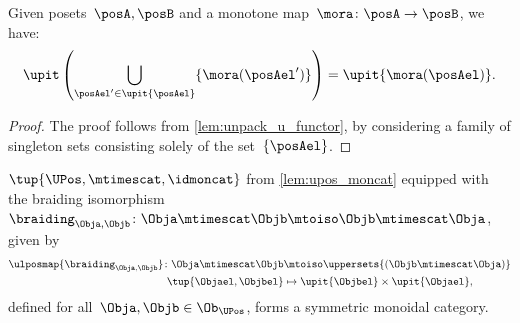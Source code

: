\begin{lemma}
  \label{lem:unpack_part_2}
  Given posets~$\posA,\posB$ and a monotone map~$\mora\colon \posA\to \posB$, we have:
  \begin{equation}
    \upit \left( \bigcup_{\posAel'\in \upit \{\posAel\}} \{\mora(\posAel')\}\right)=\upit \{\mora(\posAel)\}.
  \end{equation}
\end{lemma}
\begin{proof}
  The proof follows from \cref{lem:unpack_u_functor}, by considering a family of singleton sets consisting solely of the set~$\{\posAel\}$.
\end{proof}

\begin{lemma}
    \label{lem:UPos-is-sym-mon}
    $\tup{\UPos,\mtimescat,\idmoncat}$ from \cref{lem:upos_moncat} equipped with the braiding isomorphism~$\braiding_{\Obja,\Objb}\colon \Obja \mtimescat \Objb \mtoiso \Objb \mtimescat \Obja$, given by
    \begin{equation}
        \label{eq:Upos-braiding}
        \begin{aligned}
        \ulposmap{\braiding_{\Obja,\Objb}}\colon \Obja \mtimescat \Objb &\mtoiso \uppersets{(\Objb \mtimescat \Obja)}\\
            \tup{\Objael,\Objbel}&\mapsto \upit\{\Objbel\} \times \upit\{\Objael\},
        \end{aligned}
    \end{equation}
    defined for all~$\Obja,\Objb\in \Ob_{\UPos}$, forms a symmetric monoidal category.
\end{lemma}
